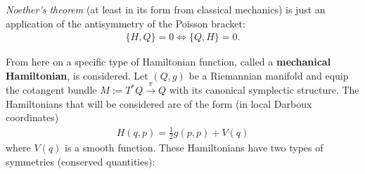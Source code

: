     \begin{result}
        \textit{Noether's theorem} (at least in its form from classical mechanics) is just an application of the antisymmetry of the Poisson bracket:
        \begin{gather}
            \{H,Q\} = 0\iff\{Q,H\} = 0.
        \end{gather}
    \end{result}

    From here on a specific type of Hamiltonian function, called a \textbf{mechanical Hamiltonian}, is considered. Let $(Q,g)$ be a Riemannian manifold and equip the cotangent bundle $M:=T^*Q\overset{\pi}{\rightarrow}Q$ with its canonical symplectic structure. The Hamiltonians that will be considered are of the form (in local Darboux coordinates)
    \begin{gather}
        H(q,p) = \frac{1}{2}g(p,p) + V(q)
    \end{gather}
    where $V(q)$ is a smooth function. These Hamiltonians have two types of symmetries (conserved quantities):

